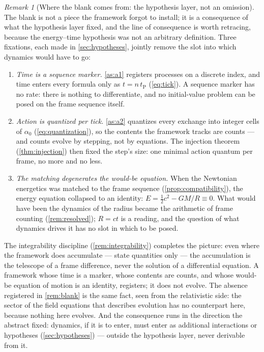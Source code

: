 \documentclass[11pt]{amsbook}
\theoremstyle{plain}
\theoremstyle{definition}
\theoremstyle{remark}
\newtheorem{remark}[theorem]{Remark}
\begin{document}
\begin{remark}[Where the blank comes from: the hypothesis layer, not an omission]\label{rem:no-dynamics-why}
The blank is not a piece the framework forgot to install; it is a consequence of what the hypothesis layer fixed, and the line of consequence is worth retracing, because the energy--time hypothesis was not an arbitrary definition. Three fixations, each made in \cref{sec:hypotheses}, jointly remove the slot into which dynamics would have to go:
\begin{enumerate}
\item \emph{Time is a sequence marker.} \cref{as:a1} registers processes on a discrete index, and time enters every formula only as $t = n\,t_{\mathrm P}$ (\cref{eq:tick}). A sequence marker has no rate: there is nothing to differentiate, and no initial-value problem can be posed on the frame sequence itself.
\item \emph{Action is quantized per tick.} \cref{as:a2} quantizes every exchange into integer cells of $\alpha_{0}$ (\cref{eq:quantization}), so the contents the framework tracks are counts --- and counts evolve by stepping, not by equations. The injection theorem (\cref{thm:injection}) then fixed the step's size: one minimal action quantum per frame, no more and no less.
\item \emph{The matching degenerates the would-be equation.} When the Newtonian energetics was matched to the frame sequence (\cref{prop:compatibility}), the energy equation collapsed to an identity: $E = \tfrac12 c^{2} - GM/R \equiv 0$. What would have been the dynamics of the radius became the arithmetic of frame counting (\cref{rem:resolved}); $R = ct$ is a reading, and the question of what dynamics drives it has no slot in which to be posed.
\end{enumerate}
The integrability discipline (\cref{rem:integrability}) completes the picture: even where the framework does accumulate --- state quantities only --- the accumulation is the telescope of a frame difference, never the solution of a differential equation. A framework whose time is a marker, whose contents are counts, and whose would-be equation of motion is an identity, registers; it does not evolve. The absence registered in \cref{rem:blank} is the same fact, seen from the relativistic side: the sector of the field equations that describes evolution has no counterpart here, because nothing here evolves. And the consequence runs in the direction the abstract fixed: dynamics, if it is to enter, must enter as additional interactions or hypotheses (\cref{sec:hypotheses}) --- outside the hypothesis layer, never derivable from it.
\end{remark}
\end{document}
